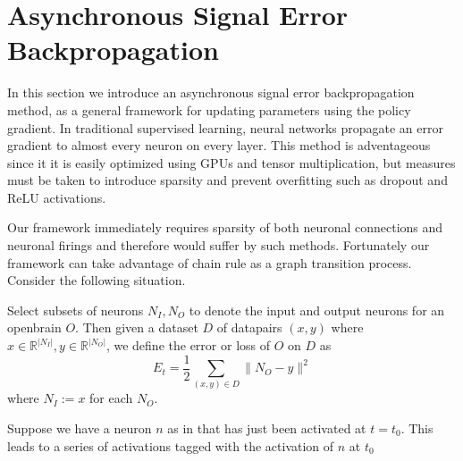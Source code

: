 \section{Asynchronous Signal Error Backpropagation}

In this section we introduce an asynchronous signal error backpropagation method,
as a general framework for updating parameters using the policy gradient. In traditional
supervised learning, neural networks propagate an error gradient to almost every neuron on every layer.
This method is adventageous since it it is easily optimized using GPUs and tensor multiplication, but measures must be 
taken to introduce sparsity and prevent overfitting such as dropout and ReLU activations. 

Our framework immediately requires sparsity of both neuronal connections and neuronal firings and therefore would suffer 
by such methods. Fortunately our framework can take advantage of chain rule as a graph transition process. Consider the following situation.

\begin{definition}
	Select subsets of neurons $N_I, N_O$ to denote the input and output neurons for an openbrain $O.$ Then given a dataset $D$ of datapairs $(x,y)$ where $x \in \mathbb{R}^{|N_I|}, y \in \mathbb{R}^{|N_O|}$, we define the error or loss of $O$ on $D$ as 
	\begin{equation}
		E_{t}= \frac{1}{2}\sum_{(x,y) \in D} \|N_O - y\|^2
	\end{equation}
	where $N_I := x$ for each $N_O.$
\end{definition}

Suppose we have a neuron $n$ as in  that has just been activated at $t = t_0.$ This leads to a series of activations tagged with the activation of $n$ at $t_0$ 


